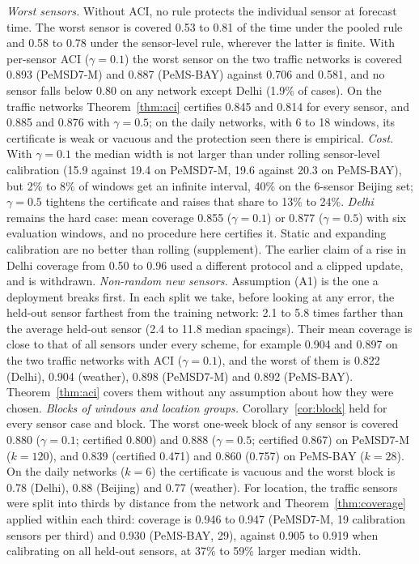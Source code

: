 \documentclass[journal,twoside,web]{ieeecolor}
\begin{document}
\emph{Worst sensors.} Without ACI, no rule protects the individual sensor at forecast time. The worst sensor is
covered 0.53 to 0.81 of the time under the pooled rule and 0.58 to 0.78 under the sensor-level rule, wherever the
latter is finite. With per-sensor ACI ($\gamma=0.1$) the worst sensor on the two traffic networks is covered 0.893
(PeMSD7-M) and 0.887 (PeMS-BAY) against 0.706 and 0.581, and no sensor falls below 0.80 on any network except Delhi
(1.9\% of cases). On the traffic networks Theorem~\ref{thm:aci} certifies 0.845 and 0.814 for every sensor, and
0.885 and 0.876 with $\gamma=0.5$; on the daily networks, with 6 to 18 windows, its certificate is weak or vacuous
and the protection seen there is empirical.  \emph{Cost.} With $\gamma=0.1$ the median width is not larger
than under rolling sensor-level calibration (15.9 against 19.4 on PeMSD7-M, 19.6 against 20.3 on PeMS-BAY), but 2\% to 8\% of windows get an infinite interval, 40\% on the
6-sensor Beijing set; $\gamma=0.5$ tightens the certificate and raises that share to 13\% to 24\%. \emph{Delhi} remains
the hard case: mean coverage 0.855 ($\gamma=0.1$) or 0.877 ($\gamma=0.5$) with six evaluation windows, and no
procedure here certifies it. Static and expanding calibration are no better than rolling (supplement).
The earlier claim of a rise in Delhi coverage from 0.50 to 0.96 used a different protocol and a clipped update, and is withdrawn.
\emph{Non-random new sensors.} Assumption (A1) is the one a deployment breaks first. In each split we take, before
looking at any error, the held-out sensor farthest from the training network: 2.1 to 5.8 times farther than the
average held-out sensor (2.4 to 11.8 median spacings). Their mean coverage is close to that of all sensors under
every scheme, for example 0.904 and 0.897 on the two traffic networks with ACI ($\gamma=0.1$), and the worst of
them is 0.822 (Delhi), 0.904 (weather), 0.898 (PeMSD7-M) and 0.892 (PeMS-BAY). Theorem~\ref{thm:aci} covers them
without any assumption about how they were chosen.
\emph{Blocks of windows and location groups.} Corollary~\ref{cor:block} held for every sensor case and block. The worst
one-week block of any sensor is covered 0.880 ($\gamma=0.1$; certified 0.800) and 0.888 ($\gamma=0.5$; certified 0.867) on
PeMSD7-M ($k=120$), and 0.839 (certified 0.471) and 0.860 (0.757) on PeMS-BAY ($k=28$). On the daily networks ($k=6$) the certificate is vacuous and the worst block is 0.78 (Delhi), 0.88 (Beijing) and 0.77 (weather). For location, the traffic sensors were split into thirds by distance from the network and
Theorem~\ref{thm:coverage} applied within each third: coverage is 0.946 to 0.947 (PeMSD7-M, 19 calibration sensors per
third) and 0.930 (PeMS-BAY, 29), against 0.905 to 0.919 when calibrating on all held-out sensors, at 37\% to 59\% larger
median width. 
\end{document}
